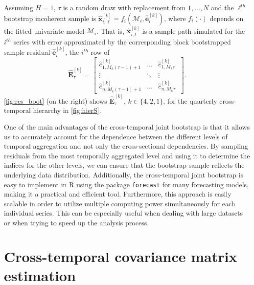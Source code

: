 \documentclass[12pt]{article}
\newcommand{\evet}{\bm{e}}
\newcommand{\xvet}{\bm{x}}
\newcommand{\Evet}{\bm{E}}
\theoremstyle{definition}
\begin{document}
Assuming $H = 1$, $\tau$ is a random draw with replacement from $1,\dots, N$ and the $\ell^{th}$ bootstrap incoherent sample is
$
	\widehat{\xvet}_{i,\ell}^{[k]} = f_i(\mathcal{M}_i, \widehat{\evet}_{i}^{[k]})$,
where $f_i(\cdot)$ depends on the fitted univariate model $\mathcal{M}_i$. That is, $\widehat{\xvet}_{i,l}^{[k]}$ is a sample path simulated for the $i^{th}$ series with error approximated by the corresponding block bootstrapped sample residual $\widehat{\evet}_{i}^{[k]}$, the $i^{th}$ row of
$$
	\widehat{\Evet}^{[k]}_{\tau} = \begin{bmatrix}
		\widehat{e}^{[k]}_{1,M_k(\tau-1)+1} & \dots  & \widehat{e}^{[k]}_{1,M_k\tau}   \\
		\vdots                              & \ddots & \vdots                          \\
		\widehat{e}^{[k]}_{n,M_k(\tau-1)+1} & \dots  & \widehat{e}^{[k]}_{n,M_k\tau} \
	\end{bmatrix}.
$$
\autoref{fig:res_boot} (on the right) shows $\widehat{\Evet}^{[k]}_{\tau}$, $k\in\{4,2,1\}$, for the quarterly cross-temporal hierarchy in \autoref{fig:hierS}.

One of the main advantages of the cross-temporal joint bootstrap is that it allows us to accurately account for the dependence between the different levels of temporal aggregation and not only the cross-sectional dependencies. By sampling residuals from the most temporally aggregated level and using it to determine the indices for the other levels, we can ensure that the bootstrap sample reflects the underlying data distribution. Additionally, the cross-temporal joint bootstrap is easy to implement in R \citep{rcoreteam2022} using the package \texttt{forecast} \citep{Rforecast} for many forecasting models, making it a practical and efficient tool. Furthermore, this approach is easily scalable in order to utilize multiple computing power simultaneously for each individual series. This can be especially useful when dealing with large datasets or when trying to speed up the analysis process.



\section{Cross-temporal covariance matrix estimation}\label{sec:shrtech}
\end{document}
